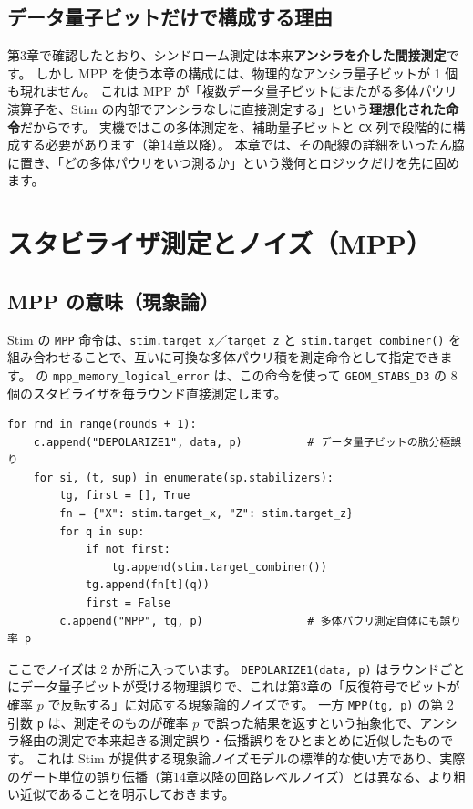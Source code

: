 \subsection{データ量子ビットだけで構成する理由}

第3章で確認したとおり、シンドローム測定は本来\textbf{アンシラを介した間接測定}です。
しかし MPP を使う本章の構成には、物理的なアンシラ量子ビットが 1 個も現れません。
これは MPP が「複数データ量子ビットにまたがる多体パウリ演算子を、Stim の内部でアンシラなしに直接測定する」という\textbf{理想化された命令}だからです。
実機ではこの多体測定を、補助量子ビットと \texttt{CX} 列で段階的に構成する必要があります（第14章以降）。
本章では、その配線の詳細をいったん脇に置き、「どの多体パウリをいつ測るか」という幾何とロジックだけを先に固めます。

\section{スタビライザ測定とノイズ（MPP）}\label{sec:mpp_noise}

\subsection{MPP の意味（現象論）}

Stim の \texttt{MPP} 命令は、\texttt{stim.target\_x}／\texttt{target\_z} と \texttt{stim.target\_combiner()} を組み合わせることで、互いに可換な多体パウリ積を測定命令として指定できます\cite{gidney2021stim,stim2026python}。
 の \texttt{mpp\_memory\_logical\_error} は、この命令を使って \texttt{GEOM\_STABS\_D3} の 8 個のスタビライザを毎ラウンド直接測定します。

\begin{lstlisting}[caption={MPP によるスタビライザ測定（\codepath{src/stages/01_mpp/src/ftqc/surface_patch.py} の \texttt{mpp\_memory\_logical\_error} を抜粋）},label=lst:mpp_measure]
for rnd in range(rounds + 1):
    c.append("DEPOLARIZE1", data, p)          # データ量子ビットの脱分極誤り
    for si, (t, sup) in enumerate(sp.stabilizers):
        tg, first = [], True
        fn = {"X": stim.target_x, "Z": stim.target_z}
        for q in sup:
            if not first:
                tg.append(stim.target_combiner())
            tg.append(fn[t](q))
            first = False
        c.append("MPP", tg, p)                # 多体パウリ測定自体にも誤り率 p
\end{lstlisting}

ここでノイズは 2 か所に入っています。
\texttt{DEPOLARIZE1(data, p)} はラウンドごとにデータ量子ビットが受ける物理誤りで、これは第3章の「反復符号でビットが確率 $p$ で反転する」に対応する現象論的ノイズです。
一方 \texttt{MPP(tg, p)} の第 2 引数 \texttt{p} は、測定そのものが確率 $p$ で誤った結果を返すという抽象化で、アンシラ経由の測定で本来起きる測定誤り・伝播誤りをひとまとめに近似したものです。
これは Stim が提供する現象論ノイズモデルの標準的な使い方であり、実際のゲート単位の誤り伝播（第14章以降の回路レベルノイズ）とは異なる、より粗い近似であることを明示しておきます。


